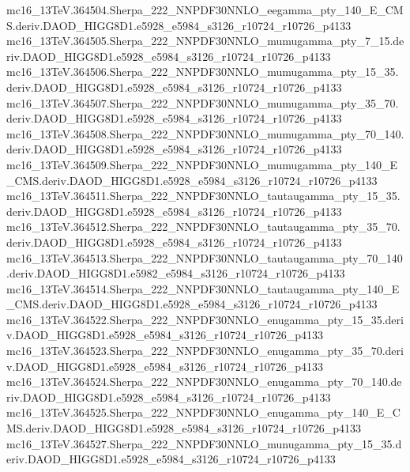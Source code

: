 \begin{footnotesize}
mc16\_13TeV.364504.Sherpa\_222\_NNPDF30NNLO\_eegamma\_pty\_140\_E\_CMS.deriv.DAOD\_HIGG8D1.e5928\_e5984\_s3126\_r10724\_r10726\_p4133 \\
mc16\_13TeV.364505.Sherpa\_222\_NNPDF30NNLO\_mumugamma\_pty\_7\_15.deriv.DAOD\_HIGG8D1.e5928\_e5984\_s3126\_r10724\_r10726\_p4133 \\
mc16\_13TeV.364506.Sherpa\_222\_NNPDF30NNLO\_mumugamma\_pty\_15\_35.deriv.DAOD\_HIGG8D1.e5928\_e5984\_s3126\_r10724\_r10726\_p4133 \\
mc16\_13TeV.364507.Sherpa\_222\_NNPDF30NNLO\_mumugamma\_pty\_35\_70.deriv.DAOD\_HIGG8D1.e5928\_e5984\_s3126\_r10724\_r10726\_p4133 \\
mc16\_13TeV.364508.Sherpa\_222\_NNPDF30NNLO\_mumugamma\_pty\_70\_140.deriv.DAOD\_HIGG8D1.e5928\_e5984\_s3126\_r10724\_r10726\_p4133 \\
mc16\_13TeV.364509.Sherpa\_222\_NNPDF30NNLO\_mumugamma\_pty\_140\_E\_CMS.deriv.DAOD\_HIGG8D1.e5928\_e5984\_s3126\_r10724\_r10726\_p4133 \\
mc16\_13TeV.364511.Sherpa\_222\_NNPDF30NNLO\_tautaugamma\_pty\_15\_35.deriv.DAOD\_HIGG8D1.e5928\_e5984\_s3126\_r10724\_r10726\_p4133 \\
mc16\_13TeV.364512.Sherpa\_222\_NNPDF30NNLO\_tautaugamma\_pty\_35\_70.deriv.DAOD\_HIGG8D1.e5928\_e5984\_s3126\_r10724\_r10726\_p4133 \\
mc16\_13TeV.364513.Sherpa\_222\_NNPDF30NNLO\_tautaugamma\_pty\_70\_140.deriv.DAOD\_HIGG8D1.e5982\_e5984\_s3126\_r10724\_r10726\_p4133 \\
mc16\_13TeV.364514.Sherpa\_222\_NNPDF30NNLO\_tautaugamma\_pty\_140\_E\_CMS.deriv.DAOD\_HIGG8D1.e5928\_e5984\_s3126\_r10724\_r10726\_p4133 \\
mc16\_13TeV.364522.Sherpa\_222\_NNPDF30NNLO\_enugamma\_pty\_15\_35.deriv.DAOD\_HIGG8D1.e5928\_e5984\_s3126\_r10724\_r10726\_p4133 \\
mc16\_13TeV.364523.Sherpa\_222\_NNPDF30NNLO\_enugamma\_pty\_35\_70.deriv.DAOD\_HIGG8D1.e5928\_e5984\_s3126\_r10724\_r10726\_p4133 \\
mc16\_13TeV.364524.Sherpa\_222\_NNPDF30NNLO\_enugamma\_pty\_70\_140.deriv.DAOD\_HIGG8D1.e5928\_e5984\_s3126\_r10724\_r10726\_p4133 \\
mc16\_13TeV.364525.Sherpa\_222\_NNPDF30NNLO\_enugamma\_pty\_140\_E\_CMS.deriv.DAOD\_HIGG8D1.e5928\_e5984\_s3126\_r10724\_r10726\_p4133 \\
mc16\_13TeV.364527.Sherpa\_222\_NNPDF30NNLO\_munugamma\_pty\_15\_35.deriv.DAOD\_HIGG8D1.e5928\_e5984\_s3126\_r10724\_r10726\_p4133 \\

\end{footnotesize}

